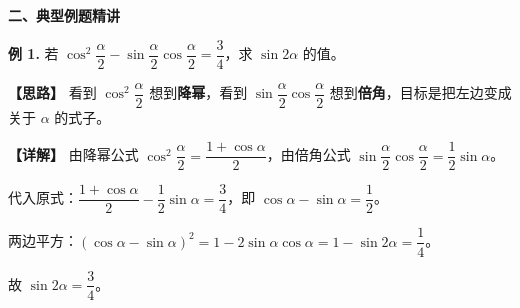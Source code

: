 \documentclass[UTF8,10pt,aspectratio=169]{ctexbeamer}
\begin{document}
	\begin{frame}
		\begin{center}
			{\Large \textbf{二、典型例题精讲}}
		\end{center}
		\vspace{0.3cm}
		
		\textbf{例 1.} 若 $\cos^2\dfrac{\alpha}{2} - \sin\dfrac{\alpha}{2}\cos\dfrac{\alpha}{2} = \dfrac{3}{4}$，求 $\sin 2\alpha$ 的值。
		
		\vspace{0.3cm}
		\textbf{【思路】} 看到 $\cos^2\dfrac{\alpha}{2}$ 想到\textbf{降幂}，看到 $\sin\dfrac{\alpha}{2}\cos\dfrac{\alpha}{2}$ 想到\textbf{倍角}，目标是把左边变成关于 $\alpha$ 的式子。
		
		\pause
		\vspace{0.3cm}
		\textbf{【详解】} 由降幂公式 $\cos^2\dfrac{\alpha}{2} = \dfrac{1+\cos\alpha}{2}$，由倍角公式 $\sin\dfrac{\alpha}{2}\cos\dfrac{\alpha}{2} = \dfrac{1}{2}\sin\alpha$。
		
		\vspace{0.2cm}
		代入原式：$\dfrac{1+\cos\alpha}{2} - \dfrac{1}{2}\sin\alpha = \dfrac{3}{4}$，即 $\cos\alpha - \sin\alpha = \dfrac{1}{2}$。
		
		\vspace{0.2cm}
		两边平方：$(\cos\alpha - \sin\alpha)^2 = 1 - 2\sin\alpha\cos\alpha = 1 - \sin 2\alpha = \dfrac{1}{4}$。
		
		\vspace{0.2cm}
		故 $\boxed{\sin 2\alpha = \dfrac{3}{4}}$。
	\end{frame}
	
\end{document}
